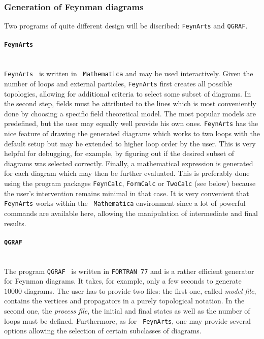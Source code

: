 \subsubsection{Generation of Feynman diagrams}
%
Two programs of quite different design will be discribed: {\tt FeynArts}
and {\tt QGRAF}.


\paragraph{{\tt FeynArts}}\mbox{}\\[1em]
%
{\tt FeynArts}~\cite{FeynArts} is written in {\tt
  Mathematica} and may be used interactively.  Given the
number of loops and external particles, {\tt FeynArts} first creates all
possible topologies, allowing for additional criteria to select some
subset of diagrams.  In the second step, fields must be attributed to
the lines which is most conveniently done by choosing a specific field
theoretical model.  The most popular models are predefined, but the user
may equally well provide his own ones.  {\tt FeynArts} has the nice
feature of drawing the generated diagrams which works to two loops with the
default setup but may be extended to higher loop order by the
user.  This is very helpful for debugging, for example, by figuring out
if the desired subset of diagrams was selected correctly.
Finally, a
mathematical expression is generated for each diagram which may then be
further evaluated.  This is preferably done using the program packages
{\tt FeynCalc}, {\tt FormCalc} or {\tt TwoCalc} (see below)
because the user's intervention remains minimal in that case.
It is very convenient that {\tt FeynArts} works within the {\tt
  Mathematica} environment since a lot of powerful commands are
available here, allowing the manipulation of intermediate and final
results.


\paragraph{{\tt QGRAF}}\mbox{}\\[1em]
%
The program {\tt QGRAF}~\cite{Nog93} is written in {\tt FORTRAN~77} and
is a rather efficient generator for Feynman diagrams.  It takes, for
example, only a few seconds to generate $10000$ diagrams.  The user has
to provide two files: the first one, called {\it model file}, contains
the vertices and propagators in a purely topological notation.  In the
second one, the {\it process file}, the initial and final states as well
as the number of loops must be defined.  Furthermore, as for {\tt
  FeynArts}, one may provide several options allowing the selection of
certain subclasses of diagrams.

